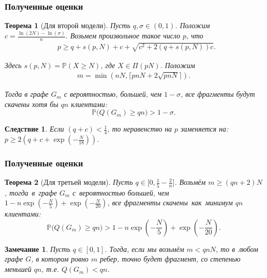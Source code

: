 \documentclass[pdf, intlimits, 12pt, unicode]{beamer} %
\newcommand{\PRob}{\mathbb P}
\newcommand{\geqs}{\geqslant}
\newtheorem*{theoremm}{Теорема}
\newtheorem*{cons}{Следствие}
\newtheorem*{notee}{Замечание}
\begin{document}
\begin{frame}
	\frametitle{Полученные оценки}
	\begin{theoremm}[Для второй модели]
		Пусть $q, \sigma \in (0, 1)$. Положим $c = \frac{\ln(2N) - \ln(\sigma)}{n}$.
		Возьмем произвольное такое число $p$, что 
			\vspace{-3mm}
			\begin{align*}
			& p \geqs q + s(p, N) + c + \sqrt{c^2+2(q+s(p, N))c}.
			\end{align*}
			\vspace{-7mm}
			
		Здесь $s(p,N) = \PRob(X \geqs N)$, где $X \in \Pi(pN)$. Положим
			\vspace{-3mm}
			\begin{align*}
			m = \min(nN, \lceil pnN + 2\sqrt{pnN} \rceil).
			\end{align*}
			\vspace{-7mm}
			
		Тогда в графе $G_m$ с вероятностью, большей, чем $1 - \sigma$, все фрагменты будут скачены хотя бы $qn$ клиентами:
			\vspace{-3mm}
			\begin{equation*}
			\PRob\big(Q(G_m) \geqs qn\big) > 1 - \sigma.
			\end{equation*}
	\end{theoremm}

	\begin{cons}
		Если $(q+c) < \frac{1}{4}$, то неравенство на $p$ заменяется на:\\
		\quad\quad\quad\quad\quad\quad\quad
		$p \geqs 2\left(q + c + \exp\left(-\frac{N}{18}\right) \right)$.
	\end{cons}
\end{frame}


\begin{frame}	
	\frametitle{Полученные оценки}
	\begin{theoremm}[Для третьей модели]
		Пусть $q \in \big[0, \frac{1}{5} - \frac{2}{n}\big]$. 
		Возьмём $m \geqs (qn + 2) N$, тогда~в~графе $G_m$ с~вероятностью большей, 
		чем~$1 - n\exp\left(-\frac{N}{5}\right) +  \exp\left(- \frac{N}{20}\right)$, все фрагменты 
		скачены~как~минимум $qn$ клиентами:
		\vspace{-3mm}
		\begin{equation*}
		\PRob\Big( Q(G_m) \geqs qn \Big) > 1 - n\exp\left(-\frac{N}{5}\right) +  \exp\left(- \frac{N}{20}\right).
		\end{equation*}
	\end{theoremm}
	
	\begin{notee}
		Пусть $q \in [0,1]$. Тогда, если мы возьмём $m < qnN$, то в~любом графе $G$, в котором ровно $m$ ребер, точно будет фрагмент, 
		со степенью меньшей $qn$, т.е. $Q(G_m) < qn$.
	\end{notee}

\end{frame}
\end{document}
